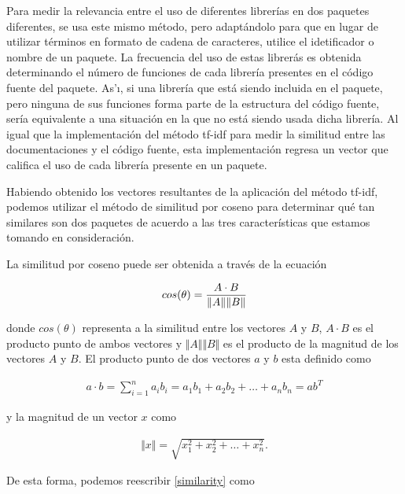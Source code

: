 \documentclass[times, 10pt,twocolumn, a4paper]{article}
\begin{document}
Para medir la relevancia entre el uso de diferentes
librer\'ias en dos paquetes diferentes, se usa este mismo m\'etodo,
pero adapt\'andolo para que en lugar de utilizar t\'erminos en formato
de cadena de caracteres, utilice el idetificador o nombre de un
paquete. La frecuencia del uso de estas librer\'as es obtenida
determinando el n\'umero de funciones de cada librer\'ia presentes en
el c\'odigo fuente del paquete. As'\i, si una librer\'ia
que est\'a siendo incluida en el paquete, pero ninguna de sus
funciones forma parte de la estructura del c\'odigo fuente,
ser\'ia equivalente a una situaci\'on en la que no est\'a siendo usada
dicha librer\'ia. Al igual que la implementaci\'on del m\'etodo tf-idf
para medir la similitud entre las documentaciones y el c\'odigo
fuente, esta implementaci\'on regresa un vector que califica el uso de
cada librer\'ia presente en un paquete.


Habiendo obtenido los vectores resultantes de la aplicaci\'on del
m\'etodo tf-idf, podemos utilizar el m\'etodo de similitud por coseno
para determinar qu\'e tan similares son dos paquetes \cite{ml4} de
acuerdo a las tres caracter\'isticas que estamos tomando en
consideraci\'on.

La similitud por coseno puede ser obtenida a trav\'es de la ecuaci\'on

\begin{equation} \label{similarity}
  cos(\theta ) = {{A \cdot B} \over {\Vert A \Vert \Vert B \Vert}}
\end{equation}

donde \( cos(\theta ) \) representa a la similitud entre los vectores
\(A\) y \(B\), \(A \cdot B\) es el producto punto de ambos vectores y
\({\Vert A \Vert \Vert B \Vert}\) es el producto de la magnitud de los
vectores \(A\) y \(B\). El producto punto de dos vectores \(a\) y
\(b\) esta definido como

\begin{align}
  {a \cdot b} = \sum_{i=1}^n a_i b_i = a_1 b_1 + a_2 b_2 + \dots + a_n
  b_n = a b^T
\end{align}

y la magnitud de un vector \(x\) como

\begin{align}
  {\Vert x \Vert} = \sqrt{x_1 ^2 + x_2 ^2 + \dots + x_n ^2}.
\end{align}

De esta forma, podemos reescribir \eqref{similarity} como
\end{document}

